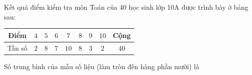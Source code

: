 \begin{ex}
Kết quả điểm kiểm tra môn Toán của $40$ học sinh lớp 10A được trình bày ở bảng sau:
\begin{center}
\begin{tabular}{|c|c|c|c|c|c|c|c|c|}\hline
Điểm & $4$ & $5$ & $6$ & $7$ & $8$ & $9$ & $10$ & Cộng\\\hline
Tần số & $2$ & $8$ & $7$ & $10$ & $8$ & $3$ & $2$ & $40$\\\hline
\end{tabular}
\end{center}
Số trung bình của mẫu số liệu (làm tròn đến hàng phần mười) là
\end{ex}
